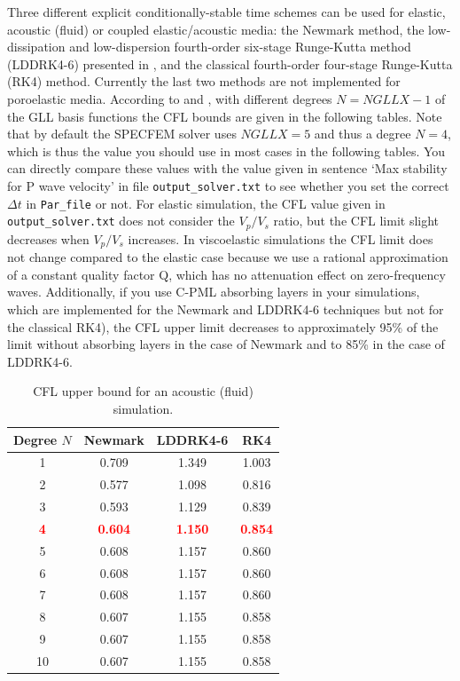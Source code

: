 \documentclass[oneside,english,onecolumn,letterpaper]{book}
\newcommand{\red}[1]{\textbf{\textcolor{Red}{#1}}}
\begin{document}
Three different explicit conditionally-stable time schemes can be used for elastic, acoustic (fluid) or coupled elastic/acoustic media:
the Newmark method, the low-dissipation and low-dispersion fourth-order six-stage Runge-Kutta method (LDDRK4-6) presented in \cite{BeBoBa06},
and the classical fourth-order four-stage Runge-Kutta (RK4) method.
Currently the last two methods are not implemented for poroelastic media.
According to \cite{DeSe10} and \cite{BeBoBa06}, with different degrees $N=NGLLX-1$ of the GLL basis functions the CFL bounds are given in the following tables.
Note that by default the SPECFEM solver uses $NGLLX = 5$ and thus a degree $N = 4$, which is thus the value you should use
in most cases in the following tables.
You can directly compare these values with the value given in sentence `Max stability for P wave velocity' in file
\texttt{output\_solver.txt} to see whether you set the correct $\Delta t$ in \texttt{Par\_file} or not.
For elastic simulation, the
CFL value given in \texttt{output\_solver.txt} does not consider the $V_p/V_s$ ratio, but the CFL limit slight decreases when $V_p/V_s$ increases.
In viscoelastic simulations the CFL limit does not change compared to the elastic case because we use a rational approximation of a constant quality factor Q, which has no attenuation effect on zero-frequency waves.
Additionally, if you use C-PML absorbing layers in your simulations, which are implemented for the Newmark and LDDRK4-6 techniques but not for the classical RK4), the CFL upper limit decreases to approximately 95\% of the limit without absorbing layers in the case of Newmark and to 85\% in the case of LDDRK4-6.
\begin{table}[ht]
\caption{CFL upper bound for an acoustic (fluid) simulation.}
\centering
\begin{tabular}{c c c c}
\hline\hline
Degree $N$ & Newmark & LDDRK4-6 & RK4 \\ [0.5ex]
\hline
1 & 0.709 & 1.349 & 1.003 \\
2 & 0.577 & 1.098 & 0.816 \\
3 & 0.593 & 1.129 & 0.839 \\
\red{4} & \red{0.604} & \red{1.150} & \red{0.854} \\
5 & 0.608 & 1.157 & 0.860 \\
6 & 0.608 & 1.157 & 0.860 \\
7 & 0.608 & 1.157 & 0.860 \\
8 & 0.607 & 1.155 & 0.858 \\
9 & 0.607 & 1.155 & 0.858 \\
10 & 0.607 & 1.155 & 0.858 \\ [1ex]
\hline
\end{tabular}
\label{table:CFLacoustic}
\end{table}
\end{document}
